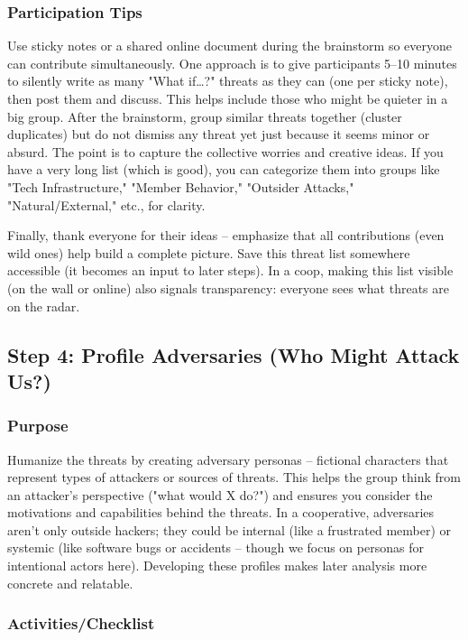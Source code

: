 \subsubsection{Participation Tips}

Use sticky notes or a shared online document during the brainstorm so everyone
can contribute simultaneously. One approach is to give participants 5–10 minutes
to silently write as many "What if…?" threats as they can (one per sticky note),
then post them and discuss. This helps include those who might be quieter in a
big group. After the brainstorm, group similar threats together (cluster
duplicates) but do not dismiss any threat yet just because it seems minor or
absurd. The point is to capture the collective worries and creative ideas. If
you have a very long list (which is good), you can categorize them into groups
like "Tech Infrastructure," "Member Behavior," "Outsider Attacks,"
"Natural/External," etc., for clarity.

Finally, thank everyone for their ideas – emphasize that all contributions (even
wild ones) help build a complete picture. Save this threat list somewhere
accessible (it becomes an input to later steps). In a coop, making this list
visible (on the wall or online) also signals transparency: everyone sees what
threats are on the radar.


\subsection{Step 4: Profile Adversaries (Who Might Attack Us?)}
\label{subsec:Step4}

\subsubsection{Purpose}

Humanize the threats by creating adversary personas – fictional characters that
represent types of attackers or sources of threats. This helps the group think
from an attacker's perspective ("what would X do?") and ensures you consider the
motivations and capabilities behind the threats. In a cooperative, adversaries
aren't only outside hackers; they could be internal (like a frustrated member)
or systemic (like software bugs or accidents – though we focus on personas for
intentional actors here). Developing these profiles makes later analysis more
concrete and relatable.

\subsubsection{Activities/Checklist}

